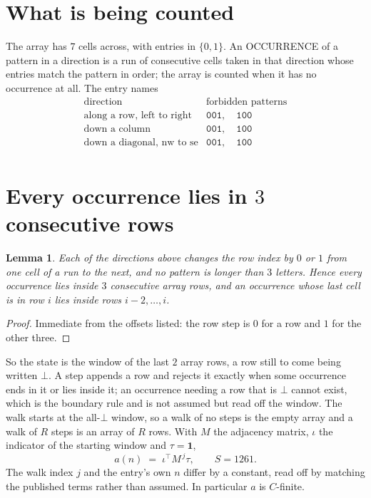 \documentclass[11pt,a4paper]{article}
\theoremstyle{plain}
\newtheorem{lemma}[theorem]{Lemma}
\theoremstyle{definition}
\begin{document}
\section{What is being counted}

The array has $7$ cells across, with entries in $\{0,1\}$. An OCCURRENCE of a pattern in a
direction is a run of consecutive cells taken in that direction whose entries match the pattern
in order; the array is counted when it has no occurrence at all. The entry names
\[
\begin{array}{ll}
\text{direction} & \text{forbidden patterns} \\[2pt]
\text{along a row, left to right} & \mathtt{001},\quad \mathtt{100} \\
\text{down a column} & \mathtt{001},\quad \mathtt{100} \\
\text{down a diagonal, nw to se} & \mathtt{001},\quad \mathtt{100} \\
\end{array}
\]


\section{Every occurrence lies in $3$ consecutive rows}

\begin{lemma}\label{lem:win}
Each of the directions above changes the row index by $0$ or $1$ from one cell of a run to the
next, and no pattern is longer than $3$ letters. Hence every occurrence lies inside $3$
consecutive array rows, and an occurrence whose last cell is in row $i$ lies inside rows
$i-2,\dots,i$.
\end{lemma}

\begin{proof}
Immediate from the offsets listed: the row step is $0$ for a row and $1$ for the other three.
\end{proof}

So the state is the window of the last $2$ array rows, a row still to come being written
$\bot$. A step appends a row and rejects it exactly when some occurrence ends in it or lies
inside it; an occurrence needing a row that is $\bot$ cannot exist, which is the boundary rule
and is not assumed but read off the window. The walk starts at the all-$\bot$ window, so a walk
of no steps is the empty array and a walk of $R$ steps is an array of $R$ rows. With $M$ the
adjacency matrix, $\iota$ the indicator of the starting window and $\tau=\mathbf{1}$,
\[
a(n)\;=\;\iota^{\!\top}M^{\,j}\tau ,\qquad S=1261.
\]
The walk index $j$ and the entry's own $n$ differ by a constant, read off by matching the
published terms rather than assumed. In particular $a$ is $C$-finite.
\end{document}
